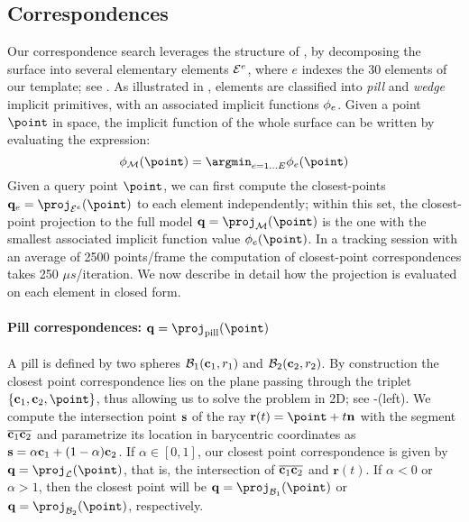 \subsection{Correspondences}
\label{sec:corresp}
Our correspondence search leverages the structure of , by decomposing the surface into several elementary elements $\mathcal{E}^e$, where $e$ indexes the 30 elements of our template; see \VideoElements{}. As illustrated in , elements are classified into 
\emph{pill} and \emph{wedge} implicit primitives, with an associated implicit functions $\phi_e$.
Given a point $\point$ in space, the implicit function of the whole surface can be written by evaluating the expression:
\begin{equation}
\implicit_\surface(\point) = \argmin_{e=1 \dots E} \implicit_e(\point)
\label{eq:piecewise}
\end{equation}
%
Given a query point $\point$, we can first compute the closest-points $\footpoint_e = \proj_{\element}(\point)$ to each element independently; within this set, the closest-point projection to the full model $\footpoint = \proj_\surface(\point)$ is the one with the smallest associated implicit function value $\implicit_e(\point)$. In a tracking session with an average of 2500 points/frame the computation of closest-point correspondences takes 250 $\mu s$/iteration. 
%
We now describe in detail how the projection is evaluated on each element in closed form. 


\paragraph{Pill correspondences: $\footpoint=\proj_\text{pill}(\point)$}
A pill is defined by two spheres $\mathcal{B}_1(\mathbf{c}_1,r_1)$ and $\mathcal{B}_2(\mathbf{c}_2,r_2)$. By construction the closest point correspondence lies on the plane passing through the triplet $\{ \ballcenter_1, \ballcenter_2, \point \}$, thus allowing us to solve the problem in 2D; see -(left). 
% 
We compute the intersection point $\mathbf{s}$ of the ray $\mathbf{r}(t) = \point + t\mathbf{n}$ with the segment $\overline{\mathbf{c}_1 \mathbf{c}_2}$ and parametrize its location in barycentric coordinates as $\mathbf{s} = \alpha\mathbf{c}_1 + (1-\alpha)\mathbf{c}_2$. If $\alpha \in [0,1]$, our closest point correspondence is given by $\footpoint=\proj_\mathcal{L}(\point)$, that is, the intersection of $\overline{\mathbf{c}_1 \mathbf{c}_2}$ and $\mathbf{r}(t)$.  If $\alpha<0$ or $\alpha>1$, then the closest point will be $\footpoint=\proj_{\ball_1}(\point)$ or $\footpoint=\proj_{\ball_2}(\point)$, respectively. 

